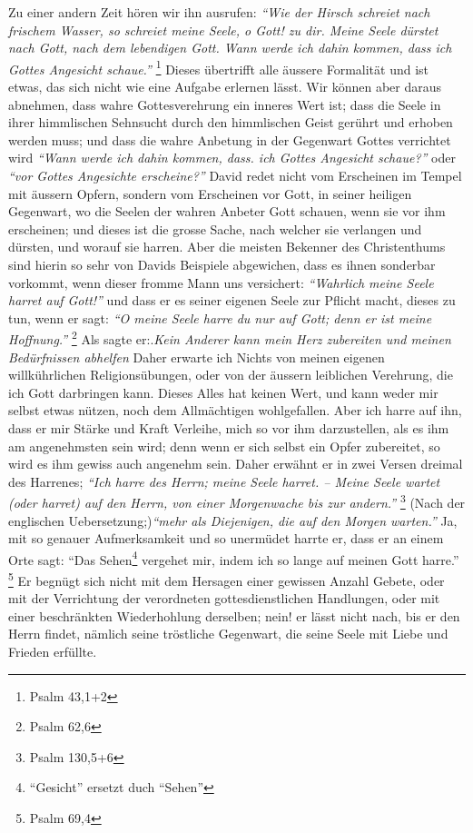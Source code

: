   Zu einer andern Zeit hören wir ihn
ausrufen:
\textit{"`Wie der Hirsch schreiet nach
frischem Wasser, so schreiet meine Seele, o Gott! zu dir. Meine Seele dürstet
nach Gott, nach dem lebendigen Gott. Wann werde ich dahin kommen, dass ich
Gottes Angesicht schaue."'}
\footnote{Psalm 43,1+2}
Dieses übertrifft alle äussere
Formalität  und ist etwas, das sich nicht wie eine
Aufgabe erlernen lässt. Wir
können aber daraus abnehmen, dass wahre Gottesverehrung ein inneres Wert ist;
dass die Seele in ihrer himmlischen Sehnsucht durch den himmlischen Geist
gerührt und erhoben werden muss; und dass die wahre Anbetung in der Gegenwart
Gottes verrichtet wird
\textit{"`Wann werde ich dahin kommen, dass. ich Gottes
Angesicht schaue?"'} oder \textit{"`vor Gottes Angesichte erscheine?"'} David
redet nicht
vom Erscheinen im Tempel  mit äussern Opfern, sondern
vom Erscheinen vor Gott, in
seiner heiligen Gegenwart, wo die Seelen der wahren Anbeter Gott schauen, wenn
sie vor ihm erscheinen; und dieses ist die grosse Sache, nach welcher sie
verlangen und dürsten, und worauf sie harren. Aber die meisten Bekenner des
Christenthums sind hierin so sehr von Davids Beispiele abgewichen, dass es ihnen
sonderbar vorkommt, wenn dieser fromme Mann uns versichert:
\textit{"`Wahrlich meine Seele harret auf Gott!"'}
und dass er es seiner eigenen Seele zur Pflicht macht,
dieses zu tun, wenn er sagt:
\textit{"`O meine Seele harre du nur auf Gott; denn er ist meine Hoffnung."'}
\footnote{Psalm 62,6}
Als sagte er:.\textit{Kein Anderer kann mein Herz
zubereiten und meinen Bedürfnissen abhelfen} Daher erwarte ich Nichts von meinen
eigenen willkührlichen Religionsübungen,
oder von der äussern leiblichen
Verehrung, die ich Gott darbringen kann. Dieses Alles hat keinen Wert, und kann
weder mir selbst etwas nützen, noch dem Allmächtigen wohlgefallen. Aber ich
harre auf ihn, dass er mir Stärke und Kraft Verleihe, mich so vor ihm
darzustellen, als es ihm am angenehmsten sein wird; denn wenn er sich selbst ein
Opfer  zubereitet, so wird es ihm gewiss auch angenehm
sein. Daher erwähnt er in
zwei Versen dreimal des Harrenes;
\textit{"`Ich harre des Herrn; meine Seele harret. --
Meine Seele wartet (oder harret) auf den Herrn, von einer Morgenwache bis zur
andern."'}
\footnote{Psalm 130,5+6}
(Nach der englischen Uebersetzung;)\textit{"`mehr als
Diejenigen, die auf den Morgen warten."'} Ja, mit so genauer Aufmerksamkeit und
so unermüdet harrte er, dass er an einem Orte sagt:
"`Das Sehen\footnote{"`Gesicht"' ersetzt duch "`Sehen"'} vergehet mir,
indem ich so lange auf meinen Gott harre."'
\footnote{Psalm 69,4}
Er begnügt sich
nicht mit dem Hersagen einer gewissen Anzahl Gebete,
oder mit der Verrichtung
der verordneten gottesdienstlichen Handlungen, oder mit einer beschränkten
Wiederhohlung derselben; nein! er lässt nicht nach, bis er den Herrn findet,
nämlich seine tröstliche Gegenwart, die seine Seele mit Liebe und Frieden
erfüllte.

